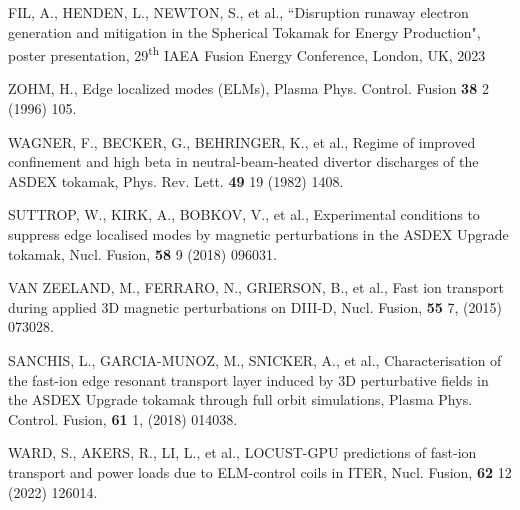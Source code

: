 \documentclass[10pt, a4paper, twoside]{article}
\begin{document}
\begin{thebibliography}{9}
    FIL, A., HENDEN, L., NEWTON, S., et al.,
    ``Disruption runaway electron generation and mitigation in the Spherical Tokamak for Energy Production",
    poster presentation, 
    29\textsuperscript{th} IAEA Fusion Energy Conference,
    London, UK, 
    2023

    ZOHM, H., 
    Edge localized modes (ELMs), 
    Plasma Phys. Control. Fusion 
    \textbf{38} 2 
    (1996) 
    105.

    WAGNER, F., BECKER, G., BEHRINGER, K., et al., 
    Regime of improved confinement and high beta in neutral-beam-heated divertor discharges of the ASDEX tokamak, 
    Phys. Rev. Lett. 
    \textbf{49} 19
    (1982) 
    1408.

    SUTTROP, W., KIRK, A., BOBKOV, V., et al.,
    Experimental conditions to suppress edge localised modes by magnetic perturbations in the ASDEX Upgrade tokamak,
    Nucl. Fusion,
    \textbf{58} 9 
    (2018) 
    096031.
    
    VAN ZEELAND, M., FERRARO, N., GRIERSON, B., et al.,
    Fast ion transport during applied 3D magnetic perturbations on DIII-D,
    Nucl. Fusion,
    \textbf{55} 7,
    (2015)
    073028.

    SANCHIS, L., GARCIA-MUNOZ, M., SNICKER, A., et al.,
    Characterisation of the fast-ion edge resonant transport layer induced by 3D perturbative fields in the ASDEX Upgrade tokamak through full orbit simulations,
    Plasma Phys. Control. Fusion,
    \textbf{61} 1,
    (2018)
    014038.
    
    WARD, S., AKERS, R., LI, L., et al.,
    LOCUST-GPU predictions of fast-ion transport and power loads due to ELM-control coils in ITER,
    Nucl. Fusion,
    \textbf{62} 12
    (2022)
    126014.


\end{thebibliography}
\end{document}
